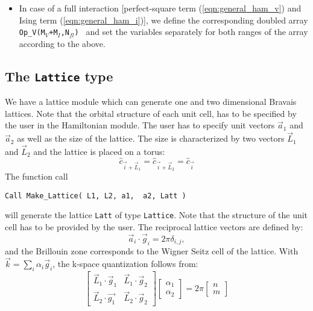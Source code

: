 \begin{itemize}
\item In case of a full interaction [perfect-square term (\ref{eqn:general_ham_v}) and Ising term (\ref{eqn:general_ham_i})],
we  define  the corresponding doubled array \texttt{Op\_V(M$_V$+M$_I$,N$_{fl}$) } and set the variables separately for both ranges of the array according to the above.  

\end{itemize}

\subsection{The \texttt{Lattice} type}\label{sec:latt}

We have a lattice module  which can generate one and two dimensional Bravais lattices.
Note that the orbital structure of each unit cell, has to be specified by the user in the Hamiltonian module. 
 The user has to specify unit vectors $\vec{a}_1$ and $\vec{a}_2$ as well as the size of the  lattice. The size is  characterized by  two vectors $\vec{L}_1$ and $\vec{L}_2$   and  the lattice is placed on a torus: 
\begin{equation}
	\hat{c}_{\vec{i} + \vec{L}_1 }  = \hat{c}_{\vec{i} + \vec{L}_2 }  = \hat{c}_{\vec{i}}
\end{equation}
The function call 
\begin{lstlisting} 
Call Make_Lattice( L1, L2, a1,  a2, Latt )
\end{lstlisting}
will generate the lattice   \texttt{Latt} of type \texttt{Lattice}.   Note that  the structure of the unit cell has to be provided by the user.    The reciprocal lattice vectors are defined by: 
\begin{equation}
\label{Latt.G.eq}
	\vec{a}_i  \cdot \vec{g}_i = 2 \pi \delta_{i,j}, 
\end{equation}
and the Brillouin zone corresponds to the Wigner Seitz cell of the lattice. 
With $\vec{k} = \sum_{i} \alpha_i  \vec{g}_i $, the  k-space quantization follows from: 
\begin{equation}
\begin{bmatrix}
	\vec{L}_1 \cdot \vec{g}_1  &  \vec{L}_1 \cdot \vec{g}_2  \\
	\vec{L}_2  \cdot \vec{g_1} & \vec{L}_2 \cdot  \vec{g}_2  
\end{bmatrix}
\begin{bmatrix}
   \alpha_1 \\
   \alpha_2
\end{bmatrix}
=
2 \pi 
\begin{bmatrix}
   n \\
   m
\end{bmatrix}
\end{equation}
